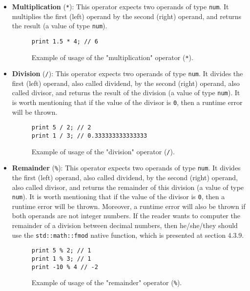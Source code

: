 \begin{itemize}
\begin{itemize}
\begin{itemize}
                    \item \textbf{Multiplication} (\texttt{*}): This operator expects two operands of type \texttt{num}. It multiplies the first (left) operand by the second (right) operand, and returns the result (a value of type \texttt{num}).
                    \begin{figure}[H]
                        \centering
                        \begin{lstlisting}
print 1.5 * 4; // 6
                        \end{lstlisting}
                        \caption{Example of usage of the "multiplication" operator (\texttt{*}).}
                    \end{figure}
                    
                    \item \textbf{Division} (\texttt{/}): This operator expects two operands of type \texttt{num}. It divides the first (left) operand, also called dividend, by the second (right) operand, also called divisor, and returns the result of the division (a value of type \texttt{num}). It is worth mentioning that if the value of the divisor is \texttt{0}, then a runtime error will be thrown.
                    \begin{figure}[H]
                        \centering
                        \begin{lstlisting}
print 5 / 2; // 2
print 1 / 3; // 0.333333333333333
                        \end{lstlisting}
                        \caption{Example of usage of the "division" operator (\texttt{/}).}
                    \end{figure}

                    
                    \item \textbf{Remainder} (\texttt{\%}): This operator expects two operands of type \texttt{num}. It divides the first (left) operand, also called dividend, by the second (right) operand, also called divisor, and returns the remainder of this division (a value of type \texttt{num}). It is worth mentioning that if the value of the divisor is \texttt{0}, then a runtime error will be thrown. Moreover, a runtime error will also be thrown if both operands are not integer numbers. If the reader wants to computer the remainder of a division between decimal numbers, then he/she/they should use the  \texttt{std::math::fmod} native function, which is presented at section 4.3.9.
                    \begin{figure}[H]
                        \centering
                        \begin{lstlisting}
print 5 % 2; // 1
print 1 % 3; // 1
print -10 % 4 // -2
                        \end{lstlisting}
                        \caption{Example of usage of the "remainder" operator (\texttt{\%}).}
                    \end{figure}
                

\end{itemize}
\end{itemize}
\end{itemize}
